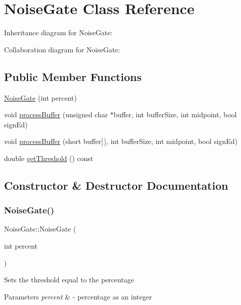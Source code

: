 \hypertarget{classNoiseGate}{}\section{Noise\+Gate Class Reference}
\label{classNoiseGate}


Inheritance diagram for Noise\+Gate\+:


Collaboration diagram for Noise\+Gate\+:
\subsection*{Public Member Functions}
\begin{DoxyCompactItemize}
\item 
\hyperlink{classNoiseGate_aab6e967dfc31e653b5bf82c699bcf93a}{Noise\+Gate} (int percent)
\item 
void \hyperlink{classNoiseGate_a72b27202c8a15f40991ffc9a60b6847f}{process\+Buffer} (unsigned char $\ast$buffer, int buffer\+Size, int midpoint, bool sign\+Ed)
\item 
void \hyperlink{classNoiseGate_a1db849961ccf2799a7df690942cb7faf}{process\+Buffer} (short buffer\mbox{[}$\,$\mbox{]}, int buffer\+Size, int midpoint, bool sign\+Ed)
\item 
double \hyperlink{classNoiseGate_acf298330b350ca82d78f8d737468455b}{get\+Threshold} () const
\end{DoxyCompactItemize}


\subsection{Constructor \& Destructor Documentation}
\mbox{\label{classNoiseGate_aab6e967dfc31e653b5bf82c699bcf93a}} 
\subsubsection{\texorpdfstring{Noise\+Gate()}{NoiseGate()}}
{\footnotesize\ttfamily Noise\+Gate\+::\+Noise\+Gate (\begin{DoxyParamCaption}\item[{int}]{percent }\end{DoxyParamCaption})}

Sets the threshold equal to the percentage 
\begin{DoxyParams}{Parameters}
{\em percent} & -\/ percentage as an integer \\
\hline
\end{DoxyParams}


